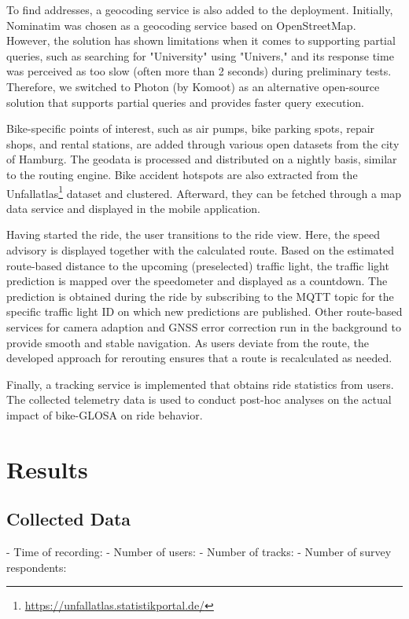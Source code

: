 To find addresses, a geocoding service is also added to the deployment. Initially, Nominatim was chosen as a geocoding service based on OpenStreetMap. However, the solution has shown limitations when it comes to supporting partial queries, such as searching for "University" using "Univers," and its response time was perceived as too slow (often more than 2 seconds) during preliminary tests. Therefore, we switched to Photon (by Komoot) as an alternative open-source solution that supports partial queries and provides faster query execution.

Bike-specific points of interest, such as air pumps, bike parking spots, repair shops, and rental stations, are added through various open datasets from the city of Hamburg. The geodata is processed and distributed on a nightly basis, similar to the routing engine. Bike accident hotspots are also extracted from the Unfallatlas\footnote{\url{https://unfallatlas.statistikportal.de/}} dataset and clustered. Afterward, they can be fetched through a map data service and displayed in the mobile application.

Having started the ride, the user transitions to the ride view. Here, the speed advisory is displayed together with the calculated route. Based on the estimated route-based distance to the upcoming (preselected) traffic light, the traffic light prediction is mapped over the speedometer and displayed as a countdown. The prediction is obtained during the ride by subscribing to the MQTT topic for the specific traffic light ID on which new predictions are published. Other route-based services for camera adaption and GNSS error correction run in the background to provide smooth and stable navigation. As users deviate from the route, the developed approach for rerouting ensures that a route is recalculated as needed.

Finally, a tracking service is implemented that obtains ride statistics from users. The collected telemetry data is used to conduct post-hoc analyses on the actual impact of bike-GLOSA on ride behavior.

\section{Results}

\subsection{Collected Data}

- Time of recording: 
- Number of users:
- Number of tracks:
- Number of survey respondents: 

